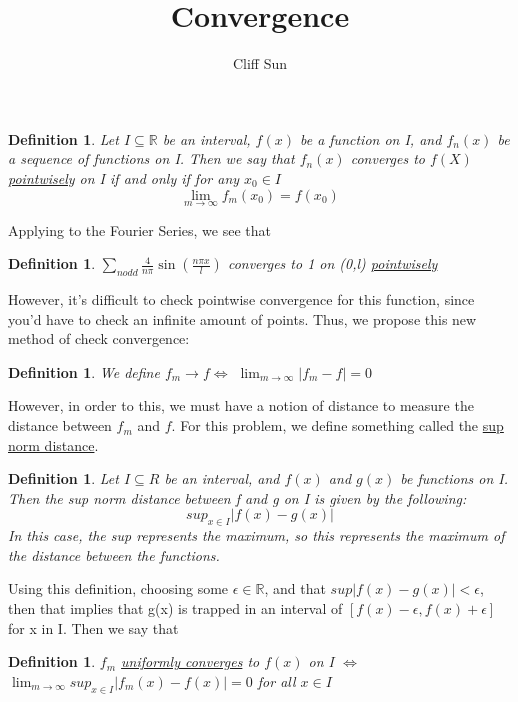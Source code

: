 \documentclass{article}
\title{Convergence}
\author{Cliff Sun}
\newtheorem{definition}[theorem]{Definition}
\begin{document}
\maketitle

\begin{definition}
    Let $I \subseteq \mathbb{R}$ be an interval, $f(x)$ be a function on I, and $f_n(x)$ be a sequence of functions on I.
    Then we say that $f_n(x)$ converges to $f(X)$ \underline{pointwisely} on I if and only if for any $x_0 \in I$
    \begin{equation}
        \lim_{m \rightarrow \infty}f_m(x_0) = f(x_0)
    \end{equation}
\end{definition}

Applying to the Fourier Series, we see that

\begin{definition}
    $\sum_{n odd} \frac{4}{n\pi}\sin(\frac{n\pi x}{l})$ converges to 1 on (0,l) \underline{pointwisely}
\end{definition}

However, it's difficult to check pointwise convergence for this function, since you'd have to check an infinite amount of points. Thus, we propose this new method of check convergence:

\begin{definition}
    We define $f_m \rightarrow f \iff $ $\lim_{m\rightarrow\infty} |f_m - f| = 0$ 
\end{definition}

However, in order to this, we must have a notion of distance to measure the distance between $f_m$ and $f$. For this problem, we define something called the \underline{sup norm distance}.

\begin{definition}
    Let $I \subseteq R$ be an interval, and $f(x)$ and $g(x)$ be functions on I. Then the sup norm distance between f and g on I is given by the following:
    \begin{equation}
        sup_{x\in I}|f(x) - g(x)|
    \end{equation}
    In this case, the sup represents the maximum, so this represents the maximum of the distance between the functions. 
\end{definition}

Using this definition, choosing some $\epsilon \in \mathbb{R}$, and that $sup|f(x)-g(x)| < \epsilon$, then that implies that g(x) is trapped in an interval of $[f(x) - \epsilon, f(x) + \epsilon]$ for x in I. Then we say that

\begin{definition}
    $f_m$ \underline{uniformly converges} to $f(x)$ on I $\iff$ $\lim_{m\rightarrow \infty}sup_{x \in I}|f_m(x) - f(x)| = 0$ for all $x \in I$
\end{definition}
\end{document}
